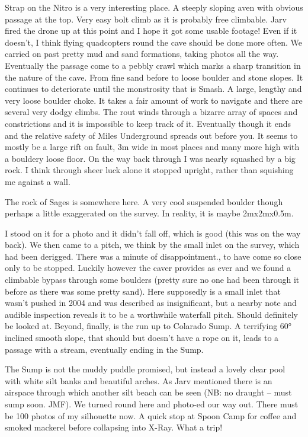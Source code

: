 Strap on the Nitro is a very interesting place. A steeply sloping aven with obvious passage at the top. Very easy bolt climb as it is probably free climbable. Jarv fired the drone up at this point and I hope it got some usable footage! Even if it doesn’t,  I think flying quadcopters round the cave should be done more often.
We carried on past pretty mud  and sand formations, taking photos all the way. Eventually the passage come to a pebbly crawl which marks a sharp transition in the nature of the cave.  From fine sand before to loose boulder and stone slopes. It continues to deteriorate until the monstrosity that is Smash. A large, lengthy and very loose boulder choke. 
It takes a fair amount of work to navigate and there are several very dodgy climbs. The rout winds through a bizarre array of spaces and constrictions and it is impossible to keep track of it.
Eventually though it ends and the relative safety of Miles Underground spreads out before you. It seems to mostly be a large rift on fault, 3m wide in most places and many more high with a bouldery loose floor. On the way back through I was nearly squashed by a big rock. I think through sheer luck alone it stopped upright, rather than squishing me against a wall. 

The rock of Sages is somewhere here. A very cool suspended boulder though perhaps a little exaggerated on the survey. In reality, it is maybe 2mx2mx0.5m.

I stood on it for a photo and it didn’t fall off, which is good (this was on the way back).
We then came to  a pitch, we think by the small inlet on the survey, which had been derigged. There was a minute of disappointment., to have come so close only to be stopped. Luckily however the caver provides as ever and we found a climbable bypass through some boulders (pretty sure no one had been through it before as there was some pretty sand).
Here supposedly is a small inlet that wasn’t pushed in 2004 and was described as insignificant, but a nearby note and audible inspection reveals it to be a worthwhile waterfall pitch. Should definitely be looked at.
Beyond, finally, is the run up to Colarado Sump. A terrifying 60° inclined smooth slope, that should but doesn’t have a rope on it,  leads to a passage with a stream, eventually ending in the Sump. 

The Sump is not the muddy puddle promised, but instead a lovely clear pool with white silt banks and beautiful arches. As Jarv mentioned there is an airspace through which another silt beach can be seen (NB: no draught – must sump soon. JMF). 
We turned round here and photo-ed our way out. There must be 100 photos of my silhouette now. A quick stop at Spoon Camp for coffee and smoked mackerel before collapsing into X-Ray. 
What a trip!

\begin{figure*}[t!]
\checkoddpage \ifoddpage \forcerectofloat \else \forceversofloat \fi

\end{figure*}
